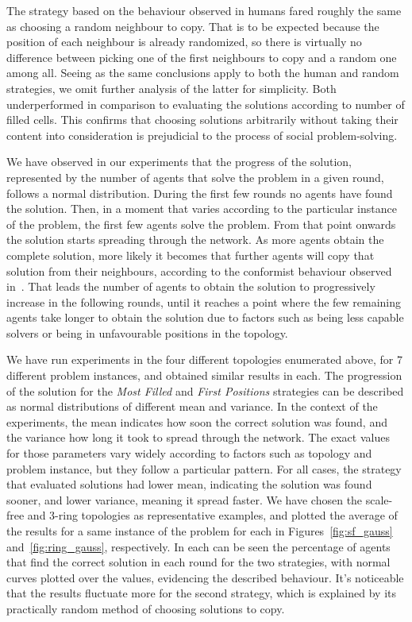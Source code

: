 \documentclass{article}
\begin{document}
The strategy based on the behaviour observed in humans fared roughly the same as choosing a random neighbour to copy. That is to be expected because the position of each neighbour is already randomized, so there is virtually no difference between picking one of the first neighbours to copy and a random one among all. Seeing as the same conclusions apply to both the human and random strategies, we omit further analysis of the latter for simplicity. Both underperformed in comparison to evaluating the solutions according to number of filled cells. This confirms that choosing solutions arbitrarily without taking their content into consideration is prejudicial to the process of social problem-solving. 

We have observed in our experiments that the progress of the solution, represented by the number of agents that solve the problem in a given round, follows a normal distribution. During the first few rounds no agents have found the solution. Then, in a moment that varies according to the particular instance of the problem, the first few agents solve the problem. From that point onwards the solution starts spreading through the network. As more agents obtain the complete solution, more likely it becomes that further agents will copy that solution from their neighbours, according to the conformist behaviour observed in~\cite{farenzena:collabem}. That leads the number of agents to obtain the solution to progressively increase in the following rounds, until it reaches a point where the few remaining agents take longer to obtain the solution due to factors such as being less capable solvers or being in unfavourable positions in the topology.

We have run experiments in the four different topologies enumerated above, for 7 different problem instances, and obtained similar results in each. The progression of the solution for the \emph{Most Filled} and \emph{First Positions} strategies can be described as normal distributions of different mean and variance. In the context of the experiments, the mean indicates how soon the correct solution was found, and the variance how long it took to spread through the network. The exact values for those parameters vary widely according to factors such as topology and problem instance, but they follow a particular pattern. For all cases, the strategy that evaluated solutions had lower mean, indicating the solution was found sooner, and lower variance, meaning it spread faster. We have chosen the scale-free and 3-ring topologies as representative examples, and plotted the average of the results for a same instance of the problem for each in Figures~\ref{fig:sf_gauss} and~\ref{fig:ring_gauss}, respectively. In each can be seen the percentage of agents that find the correct solution in each round for the two strategies, with normal curves plotted over the values, evidencing the described behaviour. It's noticeable that the results fluctuate more for the second strategy, which is explained by its practically random method of choosing solutions to copy.
\end{document}
